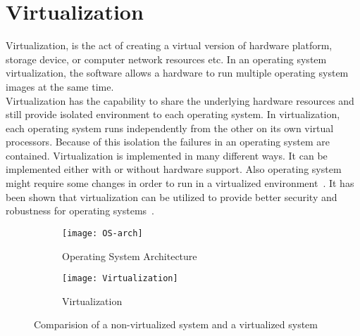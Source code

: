 \section{Virtualization}
Virtualization, is the act of creating a virtual version of hardware platform, storage device, or computer network resources etc. In an operating system virtualization, the software allows a hardware to run multiple operating system images at the same time.
\\[3mm]
Virtualization has the capability to share the underlying hardware resources and still provide isolated environment to each operating system. In virtualization, each operating system runs independently from the other on its own virtual processors. Because of this isolation the failures in an operating system are contained. Virtualization is implemented in many different ways. It can be implemented either with or without hardware support. Also operating system might require some changes in order to run in a virtualized environment~\cite{Drepper:2008:CV:1348583.1348591}. It has been shown that virtualization can be utilized to provide better security and robustness for operating systems~\cite{Fraser04safehardware, LeVasseur04UnmodifiedDriverReuse, Riley:2008:GPK:1433006.1433008}.
\begin{figure}[!ht]
    \centering
    \begin{subfigure}[b]{0.49\textwidth}
	\texttt{[image: OS-arch]}
	\caption{Operating System Architecture}
	\label{fig:OS}
    \end{subfigure}
	\hfill
    \begin{subfigure}[b]{0.49\textwidth}
	\texttt{[image: Virtualization]}
	\caption{Virtualization}
	\label{fig:Virtualization}
	\end{subfigure}
    \caption{Comparision of a non-virtualized system and a virtualized system}\label{fig:Kernel space}
\end{figure}

